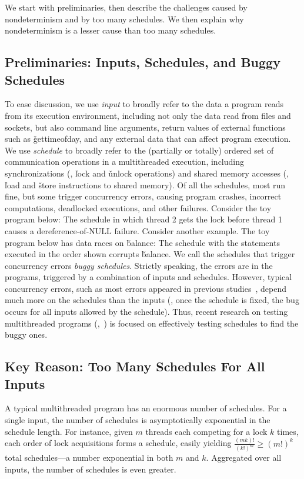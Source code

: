 We start with preliminaries, then describe the challenges caused by
nondeterminism and by too many schedules.  We then explain why
nondeterminism is a lesser cause than too many schedules.

\subsection{Preliminaries: Inputs, Schedules, and Buggy Schedules}

To ease discussion, we use \emph{input} to broadly refer to the data a
program reads from its execution environment, including not only the data
read from files and sockets, but also command line arguments, return
values of external functions such as \v{gettimeofday}, and any external data
that can affect program execution.  We use \emph{schedule} to broadly refer to
the (partially or totally) ordered set of communication operations in a
multithreaded execution, including synchronizations (\eg, \v{lock} and
\v{unlock} operations) and shared memory accesses (\eg, \v{load} and
\v{store} instructions to shared memory). Of all the schedules, most run
fine, but some trigger concurrency errors, causing program crashes,
incorrect computations, deadlocked executions, and other failures.
Consider the toy program below: 
\noindent The schedule in which thread 2 gets the lock before thread 1
causes a dereference-of-NULL failure.  Consider another example.  The toy
program below has data races on \v{balance}: 
\noindent The schedule with the statements executed in the order shown corrupts
\v{balance}. We call the schedules that trigger concurrency errors
\emph{buggy schedules}.  Strictly speaking, the errors are in the
programs, triggered by a combination of inputs and schedules.  However,
typical concurrency errors, such as most errors appeared in previous
studies~\cite{lu:concurrency-bugs,con:hotpar12}, depend much more on the
schedules than the inputs (\eg, once the schedule is fixed, the bug
occurs for all inputs allowed by the schedule).  Thus, recent research on
testing multithreaded programs (\eg,~\cite{musuvathi:chess:osdi08}) is
focused on effectively testing schedules to find the buggy ones.

\subsection{Key Reason: Too Many Schedules For All Inputs}

A typical multithreaded program has an enormous number of schedules.  For
a single input, the number of schedules is asymptotically exponential in
the schedule length.  For instance, given $m$ threads each competing for a
lock $k$ times, each order of lock acquisitions forms a schedule, easily
yielding $\frac{(mk)!}{(k!)^m} \ge (m!)^k$ total schedules---a number
exponential in both $m$ and $k$. Aggregated over all inputs, the number of
schedules is even greater.

